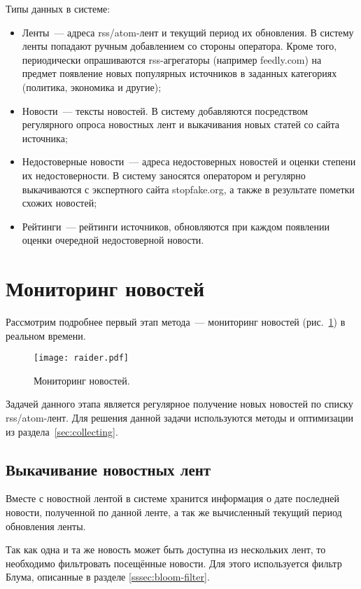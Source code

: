 Типы данных в системе:
\begin{itemize}
    \item Ленты~--- адреса rss/atom-лент и текущий период их обновления. В систему ленты попадают ручным добавлением со стороны оператора. Кроме того, периодически опрашиваются rss-агрегаторы (например feedly.com) на предмет появление новых популярных источников в заданных категориях (политика, экономика и другие);
    \item Новости~--- тексты новостей. В систему добавляются посредством регулярного опроса новостных лент и выкачивания новых статей со сайта источника;
    \item Недостоверные новости~--- адреса недостоверных новостей и оценки степени их недостоверности. В систему заносятся оператором и регулярно выкачиваются с экспертного сайта stopfake.org, а также в результате пометки схожих новостей;
    \item Рейтинги~--- рейтинги источников, обновляются при каждом появлении оценки очередной недостоверной новости.
\end{itemize}

\section{Мониторинг новостей}
Рассмотрим подробнее первый этап метода~--- мониторинг новостей (рис.~\ref{fig:raider}) в реальном времени.

\begin{figure}[h]
    \centering
    \texttt{[image: raider.pdf]}
    \caption{Мониторинг новостей.}
    \label{fig:raider}
\end{figure}

Задачей данного этапа является регулярное получение новых новостей по списку rss/atom-лент. Для решения данной задачи используются методы и оптимизации из раздела~\ref{sec:collecting}.

\subsection{Выкачивание новостных лент}
Вместе с новостной лентой в системе хранится информация о дате последней новости, полученной по данной ленте, а так же вычисленный текущий период обновления ленты.

Так как одна и та же новость может быть доступна из нескольких лент, то необходимо фильтровать посещённые новости. Для этого используется фильтр Блума, описанные в разделе \ref{sssec:bloom-filter}.

